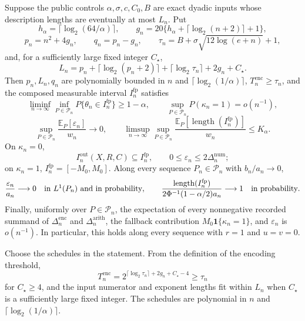 Suppose the public controls \(\alpha,\sigma,c,C_0,B\) are exact dyadic inputs whose description lengths are eventually at most \(L_n\).  Put
\[
h_\alpha=\lceil\log_2(64/\alpha)\rceil,
\qquad g_n=20\{h_\alpha+\lceil\log_2(n+2)\rceil+1\},
\]
\[
p_n=n^2+4g_n,\qquad q_n=p_n-g_n,\qquad
\tau_n=B+\sigma\sqrt{12\log(e+n)}+1,
\]
and, for a sufficiently large fixed integer \(C_\star\),
\[
L_n=p_n+\lceil\log_2(p_n+2)\rceil
+\lceil\log_2\tau_n\rceil+2g_n+C_\star.
\]
Then \(p_n,L_n,q_n\) are polynomially bounded in \(n\) and \(\lceil\log_2(1/\alpha)\rceil\), \(T_n^{\mathrm{enc}}\ge\tau_n\), and the composed measurable interval \(I_n^{\mathrm{fp}}\) satisfies
\[
\liminf_{n\to\infty}\inf_{P\in\mathcal P_n}
P\{\theta_n\in I_n^{\mathrm{fp}}\}\ge1-\alpha,
\qquad
\sup_{P\in\mathcal P_n}P(\kappa_n=1)=o(n^{-1}),
\]
\[
\sup_{P\in\mathcal P_n}
\frac{\mathbb E_P[\varepsilon_n]}{w_n}\longrightarrow0,
\qquad
\limsup_{n\to\infty}\sup_{P\in\mathcal P_n}
\frac{\mathbb E_P[\operatorname{length}(I_n^{\mathrm{fp}})]}{w_n}
\le K_\alpha.
\]
On \(\kappa_n=0\),
\[
I_n^{\mathrm{out}}(X,R,C)\subseteq I_n^{\mathrm{fp}},
\qquad
0\le\varepsilon_n\le2\Delta_n^{\mathrm{num}};
\]
on \(\kappa_n=1\), \(I_n^{\mathrm{fp}}=[-M_0,M_0]\).  Along every sequence \(P_n\in\mathcal P_n\) with \(b_n/a_n\to0\),
\[
\frac{\varepsilon_n}{a_n}\longrightarrow0
\quad\hbox{in \(L^1(P_n)\) and in probability},
\qquad
\frac{\operatorname{length}(I_n^{\mathrm{fp}})}
{2\Phi^{-1}(1-\alpha/2)a_n}\longrightarrow1
\quad\hbox{in probability}.
\]
Finally, uniformly over \(P\in\mathcal P_n\), the expectation of every nonnegative recorded summand of \(\Delta_n^{\mathrm{enc}}\) and \(\Delta_n^{\mathrm{arith}}\), the fallback contribution \(M_0\mathbf1\{\kappa_n=1\}\), and \(\varepsilon_n\) is \(o(n^{-1})\).  In particular, this holds along every sequence with \(r=1\) and \(u=v=0\).

Choose the schedules in the statement.  From the definition of the encoding threshold,
\[
T_n^{\mathrm{enc}}
=2^{\lceil\log_2\tau_n\rceil+2g_n+C_\star-4}\ge\tau_n              \tag{1}
\]
for \(C_\star\ge4\), and the input numerator and exponent lengths fit within
\(L_n\) when \(C_\star\) is a sufficiently large fixed integer.  The schedules
are polynomial in \(n\) and \(\lceil\log_2(1/\alpha)\rceil\).

